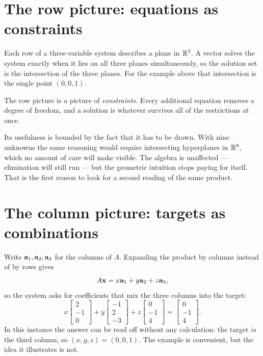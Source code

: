 \section{The row picture: equations as constraints}

Each row of a three-variable system describes a plane in \(\mathbb{R}^{3}\). A vector
solves the system exactly when it lies on all three planes simultaneously, so
the solution set is the intersection of the three planes. For the example above
that intersection is the single point \((0,0,1)\).

\begin{remark}
The row picture is a picture of \emph{constraints}. Every additional equation
removes a degree of freedom, and a solution is whatever survives all of the
restrictions at once.
\end{remark}

Its usefulness is bounded by the fact that it has to be drawn. With nine
unknowns the same reasoning would require intersecting hyperplanes in
\(\mathbb{R}^{9}\), which no amount of care will make visible. The algebra is
unaffected --- elimination will still run --- but the geometric intuition stops
paying for itself. That is the first reason to look for a second reading of the
same product.

\section{The column picture: targets as combinations}

Write \(\mathbf{a}_1,\mathbf{a}_2,\mathbf{a}_3\) for the columns of \(A\). Expanding
the product by columns instead of by rows gives
\[
	A\mathbf{x}=x\mathbf{a}_1+y\mathbf{a}_2+z\mathbf{a}_3,
\]
so the system asks for coefficients that mix the three columns into the target:
\[
	x\begin{bmatrix}2\\-1\\0\end{bmatrix}
	+y\begin{bmatrix}-1\\2\\-3\end{bmatrix}
	+z\begin{bmatrix}0\\-1\\4\end{bmatrix}
	=\begin{bmatrix}0\\-1\\4\end{bmatrix}.
\]
In this instance the answer can be read off without any calculation: the target
\emph{is} the third column, so \((x,y,z)=(0,0,1)\). The example is convenient,
but the idea it illustrates is not.

